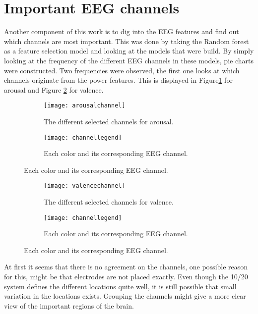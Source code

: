 \section{Important EEG channels}

Another component of this work is to dig into the EEG features and find out which channels are most important. This was done by taking the Random forest as a feature selection model and looking at the models that were build. By simply looking at the frequency of the different EEG channels in these models, pie charts were constructed. Two frequencies were observed, the first one looks at which channels originate from the power features. This is displayed in Figure\ref{arousalchannel} for arousal and Figure \ref{valencechannel} for valence.

\begin{figure}[H]
\centering

  \begin{subfigure}[b]{.5\textwidth}
    \texttt{[image: arousalchannel]}
    \caption{The different selected channels for arousal.\label{arousalchannel}}
  \end{subfigure}
\hfill
  \begin{subfigure}[b]{.4\textwidth}
    \texttt{[image: channellegend]}
    \caption{Each color and its corresponding EEG channel.}
  \end{subfigure}
\end{figure}

\begin{figure}[H]
\centering
  \begin{subfigure}[b]{.5\textwidth}
    \texttt{[image: valencechannel]}
    \caption{The different selected channels for valence.\label{valencechannel}}
  \end{subfigure}
\hfill
  \begin{subfigure}[b]{.4\textwidth}
    \texttt{[image: channellegend]}
    \caption{Each color and its corresponding EEG channel.}
  \end{subfigure}
\end{figure}


At first it seems that there is no agreement on the channels, one possible reason for this, might be that electrodes are not placed exactly. Even though the 10/20 system defines the different locations quite well, it is still possible that small variation in the locations exists. Grouping the channels might give a more clear view of the important regions of the brain.

